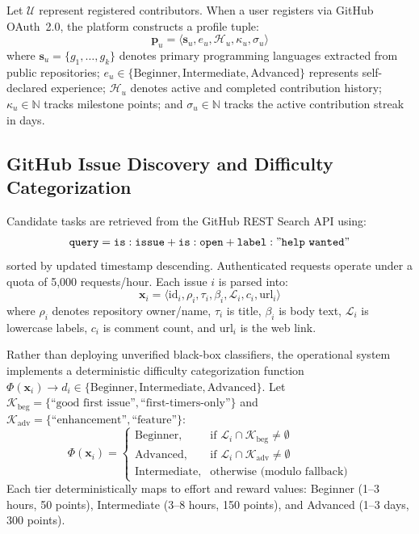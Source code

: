 \documentclass[conference]{IEEEtran}
\begin{document}
Let $\mathcal{U}$ represent registered contributors. When a user registers via GitHub OAuth~2.0, the platform constructs a profile tuple:
\begin{equation}
\mathbf{p}_u = \langle \mathbf{s}_u, e_u, \mathcal{H}_u, \kappa_u, \sigma_u \rangle
\end{equation}
where $\mathbf{s}_u = \{g_1, \dots, g_k\}$ denotes primary programming languages extracted from public repositories; $e_u \in \{\text{Beginner}, \text{Intermediate}, \text{Advanced}\}$ represents self-declared experience; $\mathcal{H}_u$ denotes active and completed contribution history; $\kappa_u \in \mathbb{N}$ tracks milestone points; and $\sigma_u \in \mathbb{N}$ tracks the active contribution streak in days.

\subsection{GitHub Issue Discovery and Difficulty Categorization}
Candidate tasks are retrieved from the GitHub REST Search API using:
\begin{equation}
\textstyle \mathtt{query = is:issue + is:open + label:"help~wanted"}
\end{equation}
sorted by updated timestamp descending. Authenticated requests operate under a quota of 5,000 requests/hour. Each issue $i$ is parsed into:
\begin{equation}
\mathbf{x}_i = \langle \text{id}_i, \rho_i, \tau_i, \beta_i, \mathcal{L}_i, c_i, \text{url}_i \rangle
\end{equation}
where $\rho_i$ denotes repository owner/name, $\tau_i$ is title, $\beta_i$ is body text, $\mathcal{L}_i$ is lowercase labels, $c_i$ is comment count, and $\text{url}_i$ is the web link.

Rather than deploying unverified black-box classifiers, the operational system implements a deterministic difficulty categorization function $\Phi(\mathbf{x}_i) \to d_i \in \{\text{Beginner}, \text{Intermediate}, \text{Advanced}\}$. Let $\mathcal{K}_{\text{beg}} = \{\text{``good first issue''}, \text{``first-timers-only''}\}$ and $\mathcal{K}_{\text{adv}} = \{\text{``enhancement''}, \text{``feature''}\}$:
\begin{equation}
\Phi(\mathbf{x}_i) = 
\begin{cases}
\text{Beginner}, & \text{if } \mathcal{L}_i \cap \mathcal{K}_{\text{beg}} \neq \emptyset \\
\text{Advanced}, & \text{if } \mathcal{L}_i \cap \mathcal{K}_{\text{adv}} \neq \emptyset \\
\text{Intermediate}, & \text{otherwise (modulo fallback)}
\end{cases}
\end{equation}
Each tier deterministically maps to effort and reward values: Beginner (1--3 hours, 50 points), Intermediate (3--8 hours, 150 points), and Advanced (1--3 days, 300 points).
\end{document}
